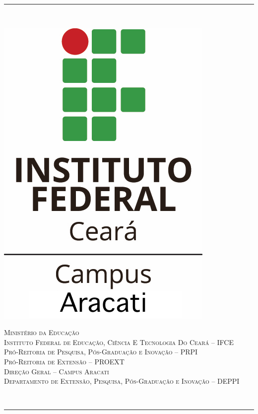 \documentclass[12pt]{article}
\begin{document}
\begin{titlepage}
\newcommand{\HRule}{\rule{\linewidth}{0.5mm}} %


\thispagestyle{empty}
\noindent\HRule \\[0.4cm]
\hspace{0.1\textwidth}
\begin{minipage}{0.15\textwidth}
\includegraphics[scale=0.17]{./logo-V-cor.jpg}
\end{minipage}
\begin{minipage}{1.2\textwidth}
{\small
\textsc{Ministério da Educação\\
Instituto Federal de Educação, Ciência E Tecnologia Do Ceará – IFCE\\
Pró-Reitoria de Pesquisa, Pós-Graduação e Inovação – PRPI\\
Pró-Reitoria de Extensão – PROEXT\\
Direção Geral – Campus Aracati\\
Departamento de Extensão, Pesquisa, Pós-Graduação e Inovação – DEPPI}
}
\end{minipage}
\\[0.4cm]
\HRule \\[1.5cm]
 

\end{titlepage}
\end{document}
